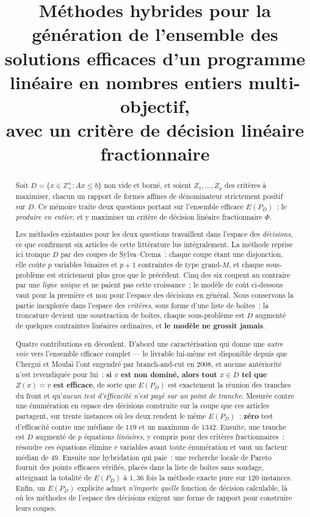 \documentclass[12pt,a4paper]{report}
\title{\bfseries Méthodes hybrides pour la génération de l'ensemble
des solutions efficaces d'un programme linéaire en nombres entiers
multi-objectif,\\[4pt] avec un critère de décision linéaire fractionnaire}
\author{}
\date{}
\newcommand{\Dset}{D}
\newcommand{\E}{E(P_D)}
\newcommand{\Z}{Z}
\theoremstyle{plain}
\theoremstyle{definition}
\begin{document}
\maketitle

\begin{abstract}
\noindent
Soit $\Dset = \{x \in \mathbb{Z}^n_+ : Ax \leqslant b\}$ non vide et borné, et
soient $\Z_1,\dots,\Z_p$ des critères à maximiser, chacun un rapport de formes
affines de dénominateur strictement positif sur $\Dset$.  Ce mémoire traite
deux questions portant sur l'ensemble efficace $\E$~: le \emph{produire en
entier}, et y maximiser un critère de décision linéaire fractionnaire $\Phi$.

Les méthodes existantes pour les deux questions travaillent dans l'espace des
\emph{décisions}, ce que confirment six articles de cette littérature lus
intégralement.  La méthode reprise ici tronque $\Dset$ par des coupes de
Sylva--Crema~: chaque coupe étant une disjonction, elle coûte $p$ variables
binaires et $p+1$ contraintes de type grand-$M$, et chaque sous-problème est
strictement plus gros que le précédent.  Cinq des six coupent au contraire par
une \emph{ligne unique} et ne paient pas cette croissance~; le modèle de coût
ci-dessous vaut pour la première et non pour l'espace des décisions en
général.  Nous conservons la partie inexplorée dans l'espace des
\emph{critères}, sous forme d'une liste de boîtes~: la troncature devient une
soustraction de boîtes, chaque sous-problème est $\Dset$ augmenté de quelques
contraintes linéaires ordinaires, et \textbf{le modèle ne grossit jamais}.

Quatre contributions en découlent.  D'abord une caractérisation qui donne une
\emph{autre voie} vers l'ensemble efficace complet --- le livrable lui-même est
disponible depuis que Chergui et Moula\"i l'ont engendré par branch-and-cut en
2008, et aucune antériorité n'est revendiquée pour lui~: \textbf{si $v$ est non
dominé, alors tout $x \in \Dset$ tel que $\Z(x) = v$ est efficace}, de sorte
que $\E$ est exactement la réunion des tranches du front et qu'\emph{aucun test
d'efficacité n'est payé sur un point de tranche}.  Mesurée contre une
énumération en espace des décisions construite sur la coupe que ces articles
partagent, sur trente instances où les deux rendent le même $\E$~:
\textbf{zéro} test d'efficacité contre une médiane de $119$ et un maximum de
$1342$.  Ensuite, une tranche est $\Dset$ augmenté
de $p$ équations \emph{linéaires}, y compris pour des critères fractionnaires~;
résoudre ces équations élimine $r$ variables avant toute énumération et vaut un
facteur médian de $49$.  Ensuite une hybridation qui paie~: une recherche
locale de Pareto fournit des points efficaces vérifiés, placés dans la liste de
boîtes sans sondage, atteignant la totalité de $\E$ à $1{,}36$ fois la méthode
exacte pure sur $120$ instances.  Enfin, un $\E$ explicite admet
\emph{n'importe quelle} fonction de décision calculable, là où les méthodes de
l'espace des décisions exigent une forme de rapport pour construire leurs
coupes.


\end{abstract}
\end{document}

